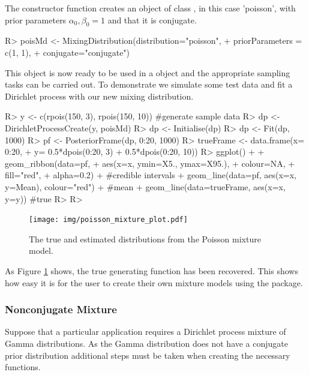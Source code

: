 \documentclass[nojss]{jss}
\begin{document}
The constructor function  creates an object of class , in this case 'poisson', with prior parameters $\alpha_0, \beta_0 = 1$ and that it is conjugate.
\begin{Schunk}
\begin{Sinput}
R> poisMd <- MixingDistribution(distribution="poisson",
+                               priorParameters = c(1, 1),
+                               conjugate="conjugate")
\end{Sinput}
\end{Schunk}
This object is now ready to be used in a  object and the appropriate sampling tasks can be carried out. To demonstrate we simulate some test data and fit a Dirichlet process with our new mixing distribution.
\newpage %
\begin{Schunk}
\begin{Sinput}
R> y <- c(rpois(150, 3), rpois(150, 10)) #generate sample data
R> dp <- DirichletProcessCreate(y, poisMd)
R> dp <- Initialise(dp)
R> dp <- Fit(dp, 1000)
R> pf <- PosteriorFrame(dp, 0:20, 1000)
R> trueFrame <- data.frame(x= 0:20,
+                          y= 0.5*dpois(0:20, 3) + 0.5*dpois(0:20, 10))
R> ggplot() +
+      geom_ribbon(data=pf,
+                  aes(x=x, ymin=X5., ymax=X95.),
+                  colour=NA,
+                  fill="red",
+                  alpha=0.2) + #credible intervals
+      geom_line(data=pf, aes(x=x, y=Mean), colour="red") + #mean
+      geom_line(data=trueFrame, aes(x=x, y=y)) #true
R> 
R> 
\end{Sinput}
\end{Schunk}

\begin{figure}[tb]
\centering
	\texttt{[image: img/poisson\_mixture\_plot.pdf]}
\caption{The true and estimated distributions from the Poisson mixture model.}
\label{fig:poissonmixture}
\end{figure}
As Figure \ref{fig:poissonmixture} shows, the true generating function has been recovered. This shows how easy it is for the user to create their own mixture models using the  package.



\subsubsection{Nonconjugate Mixture}
Suppose that a particular application requires a Dirichlet process mixture of Gamma distributions. As the Gamma distribution does not have a conjugate prior distribution additional steps must be taken when creating the necessary functions.
\end{document}
